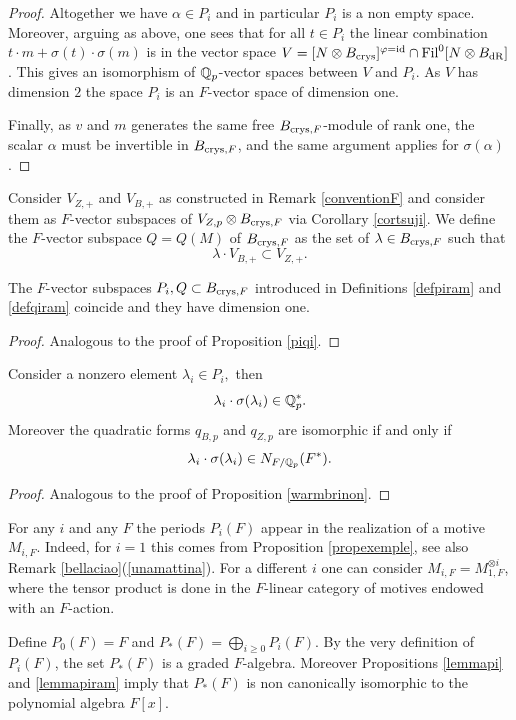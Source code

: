 \documentclass[11pt]{amsart}
\begin{document}
\begin{proof}
 Altogether we have    $\alpha \in P_i$ and in particular  $P_i$ is a non empty space. Moreover, arguing as above, one sees that for all $t \in P_i$ the linear combination $t \cdot m + \sigma(t) \cdot \sigma (m)$  is in the vector space $V=[N \otimes B_{\textnormal{crys}}]^{\varphi=\mathrm{id}} \cap  \textnormal{Fil}^0[N \otimes B_{\mathrm{dR}}] $. This gives an isomorphism of $\mathbb{Q}_p$-vector spaces between $V$ and $P_i$. As $V$ has dimension $2$ the space $P_i$ is an $F$-vector space of dimension one.
 
 Finally, as $v$ and $m$ generates the same free  $B_{\textnormal{crys},F}$-module of rank one, the scalar $\alpha$ must be invertible in $B_{\textnormal{crys},F}$, and the same argument applies for $ \sigma(\alpha)$.
\end{proof}

\begin{definition}\label{defqiram}
Consider $V_{Z,+}$ and $V_{B,+}$ as constructed in Remark \ref{conventionF} and consider them as $F$-vector subspaces of $V_{Z,p}\otimes B_{\textnormal{crys},F}$ via Corollary \ref{cortsuji}. 
We define the $F$-vector subspace $Q=Q(M)$ of $B_{\textnormal{crys},F}$ as the set of $\lambda \in B_{\textnormal{crys},F}$ such that
\[\lambda \cdot V_{B,+} \subset V_{Z,+}.\]
\end{definition}
\begin{proposition}\label{piqiram}
The $F$-vector subspaces $P_i,Q\subset B_{\textnormal{crys},F}$ introduced in Definitions \ref{defpiram} and \ref{defqiram} coincide and they have dimension one.
\end{proposition}
\begin{proof}
Analogous to the proof of Proposition \ref{piqi}.
\end{proof}


\begin{prop}\label{warmbrinonram}
Consider a nonzero element $\lambda_i \in P_i,$ then \[\lambda_i \cdot\sigma(\lambda_i) \in \mathbb{Q}^*_p.\] Moreover the quadratic forms $q_{B,p}$ and $q_{Z,p}$ are isomorphic if and only if
 \[\lambda_i \cdot\sigma(\lambda_i) \in N_{F/\mathbb{Q}_p}(F^*).\] 
\end{prop}
\begin{proof}
Analogous to the proof of Proposition \ref{warmbrinon}.
\end{proof}
\begin{remark}  
For any $i$ and any $F$ the periods $P_i(F)$ appear in the realization of a motive $M_{i,F}$. Indeed, for $i=1$ this comes from
Proposition \ref{propexemple}, see also Remark \ref{bellaciao}(\ref{unamattina}). For a different $i$ one can consider $M_{i,F}=M_{1,F}^{\otimes i}$, where the tensor product is done in the $F$-linear category of motives endowed with an $F$-action. 

Define $P_0(F)=F$ and $P_*(F)=\bigoplus_{i\geq 0} P_i(F)$. By the very definition of $P_i(F)$, the set $P_*(F)$ is a graded $F$-algebra. Moreover Propositions \ref{lemmapi} and \ref{lemmapiram} imply that $P_*(F)$  is non canonically isomorphic to the polynomial algebra $F[x]$.

\end{remark}
\end{document}
